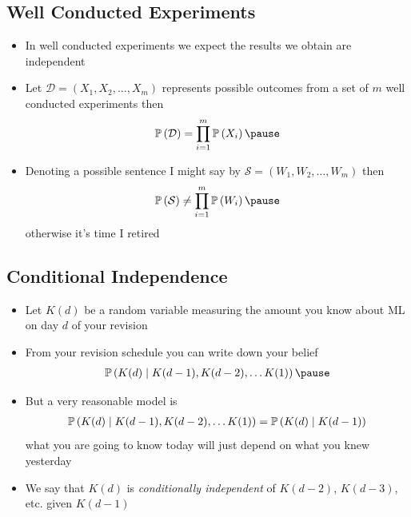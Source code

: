 \begin{slide}
\section[-2]{Well Conducted Experiments}

\begin{PauseHighLight}
  \begin{itemize}\squeeze
  \item In well conducted experiments we expect the results we obtain
    are independent\pause
  \item Let $\mathcal{D} = (X_1, X_2, \ldots, X_m)$ represents
    possible outcomes from a set of $m$ well conducted
    experiments then
    \begin{align*}
      \Prob{\mathcal{D}} = \prod_{i=1}^m \Prob{X_i}\pause
    \end{align*}
   \item Denoting a possible sentence I might say by
     $\mathcal{S}=(W_1, W_2,\ldots,W_m)$ then
     \begin{align*}
       \Prob{\mathcal{S}} \neq  \prod_{i=1}^m \Prob{W_i}\pause
     \end{align*}
     otherwise it's time I retired\pauseb
  \end{itemize}
\end{PauseHighLight}

\end{slide}


\begin{slide}
\section[-2]{Conditional Independence}

\begin{PauseHighLight}
  \begin{itemize}
  \item Let $K(d)$ be a random variable measuring the amount you know
    about ML on day $d$ of your revision\pause
  \item From your revision schedule you can write down your belief
    \begin{align*}
      \Prob{K(d) \mid K(d-1), K(d-2), \ldots K(1)}\pause
    \end{align*}
  \item But a very reasonable model is
    \begin{align*}
      \mathbb{P}\left( K(d) \mid K(d-1), K(d-2), \ldots K(1) \right) = \mathbb{P}\left( K(d)\mid K(d-1) \right)
    \end{align*}
    what you are going to know today will just depend on what you knew
    yesterday\pause
  \item We say that $K(d)$ is \emph{conditionally independent} of $K(d-2)$,
    $K(d-3)$, etc.{} given $K(d-1)$\pause
  \end{itemize}
\end{PauseHighLight}

\end{slide}


